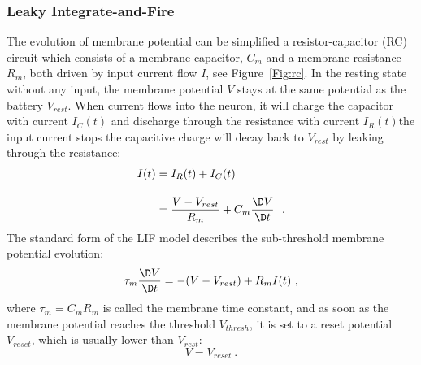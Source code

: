 \subsubsection{Leaky Integrate-and-Fire \DIFaddbegin {}\DIFaddend }
The evolution of membrane potential can be simplified \DIFdelbegin {}\DIFdelend \DIFaddbegin {}\DIFaddend a resistor-capacitor (RC) circuit which consists of a membrane capacitor, $C_m$ and a membrane resistance $R_m$, both driven by \DIFaddbegin {}\DIFaddend input current flow $I$, see Figure~\ref{Fig:rc}.
In the resting state without any input, the membrane potential $V$ stays at the same potential as the battery $V_{rest}$.
When current flows into the neuron, it will charge the capacitor with current $I_C(t)$ and discharge through the resistance with current $I_R(t)$\DIFdelbegin {}\DIFdelend \DIFaddbegin {}\DIFaddend the input current stops \DIFdelbegin {}\DIFdelend the capacitive charge will decay back to $V_{rest}$ by leaking through the resistance:
\begin{equation}
\begin{aligned}
	I(t) &= I_R(t) + I_C(t) \\[10pt]
	&= \dfrac{V-V_{rest}}{R_m} + C_m \dfrac{\D V}{\D t}~~.
\end{aligned}
\label{equ:LIF_current}
\end{equation}
The standard form of the LIF model describes the sub-threshold membrane potential evolution:
\begin{equation}
	\tau_m \dfrac{\D V}{\D t} = -(V-V_{rest}) + R_m I(t)~,
\end{equation}
where $\tau_m = C_m R_m$ is called the membrane time constant, and as soon as the membrane potential reaches the threshold $V_{thresh}$, it is set to a reset potential $V_{reset}$, which is usually lower than $V_{rest}$: 
\begin{equation}
V = V_{reset}~.
\end{equation}

